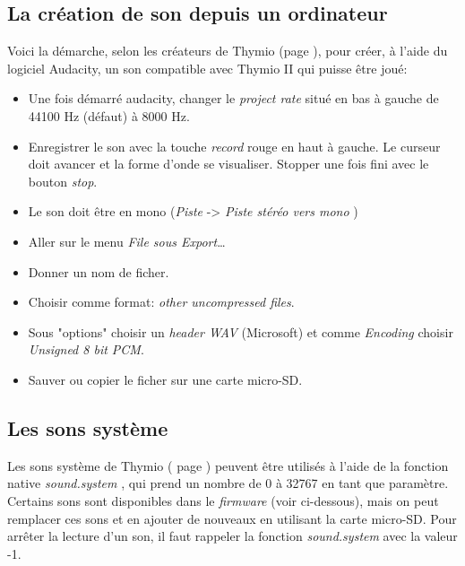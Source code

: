 \documentclass[a4paper, 12pt]{report}
\begin{document}
\subsection{La création de son depuis un ordinateur}
Voici la démarche, selon les créateurs de Thymio (page \pageref{thymio}), pour créer, à l'aide du logiciel Audacity, un son compatible avec Thymio II qui puisse être joué:\\
\begin{itemize}
\item Une fois démarré audacity, changer le \textit{project rate} situé en bas à gauche de 44100 Hz (défaut) à 8000 Hz.
\item Enregistrer le son avec la touche \textit{record} rouge en haut à gauche. Le curseur doit avancer et la forme d'onde se visualiser. Stopper une fois fini avec le bouton \textit{stop}.
\item Le son doit être en mono (\textit {Piste} -> \textit{Piste stéréo vers mono} )
\item Aller sur le menu \textit{File sous Export}…
\item Donner un nom de ficher.
\item Choisir comme format: \textit{other uncompressed files}.
\item Sous "options" choisir un \textit{header WAV} (Microsoft) et comme \textit{Encoding} choisir \textit{Unsigned 8 bit PCM}.
\item Sauver ou copier le ficher sur une carte micro-SD.
\end{itemize}

\subsection{Les sons système}
Les sons système de Thymio ( page \pageref{thymio} ) peuvent être utilisés à l'aide de la fonction native \textit{sound.system} , qui prend un nombre de 0 à 32767 en tant que paramètre. Certains sons sont disponibles dans le \textit{firmware} (voir ci-dessous), mais on peut remplacer ces sons et en ajouter de nouveaux en utilisant la carte micro-SD. Pour arrêter la lecture d'un son, il faut rappeler la fonction \textit{sound.system}  avec la valeur -1.
\end{document}
